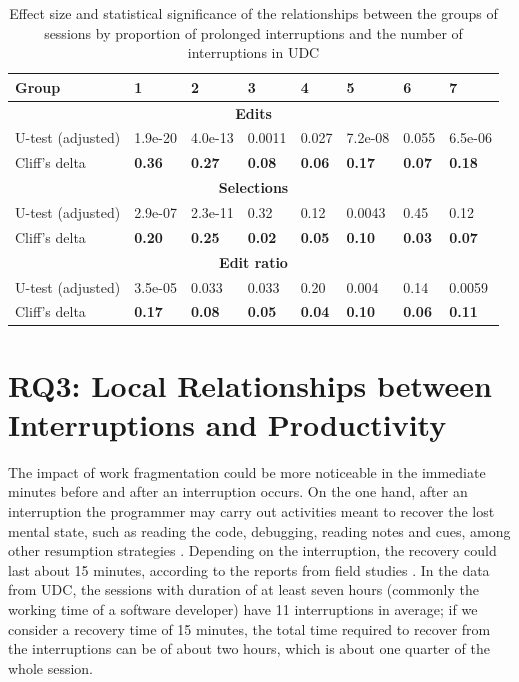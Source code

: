 \documentclass[times]{smrauth}
\begin{document}
\begin{table}[ht!]
	\tiny
	\renewcommand{\arraystretch}{1.3}
	\caption{Effect size and statistical significance of the relationships between the groups of sessions by proportion of prolonged interruptions and the number of interruptions in UDC}
	\label{tbl:effect_size_dur_udc}
	\centering
	\begin{tabular}{l | p{1cm} | p{1cm} | p{1cm} | p{1cm} | p{1cm} | p{1cm} | p{1cm}} 
		Group & 1 & 2 & 3 & 4 & 5 & 6 & 7  \\  
		\hline
		\multicolumn{8}{c}{\textbf{Edits}} \\
		\hline
		U-test (adjusted) & 1.9e-20 & 4.0e-13 & 0.0011 & 0.027 & 7.2e-08 & 0.055 & 6.5e-06\\
		\hline
		Cliff's delta & \textbf{0.36} & \textbf{0.27} & \textbf{0.08} & \textbf{0.06} & \textbf{0.17} & \textbf{0.07} & \textbf{0.18} \\
		\hline
		
		\multicolumn{8}{c}{\textbf{Selections}} \\
		\hline 
		U-test (adjusted) & 2.9e-07 & 2.3e-11 & 0.32 & 0.12 & 0.0043 & 0.45 & 0.12 \\
		\hline
		Cliff's delta & \textbf{0.20} & \textbf{0.25} & \textbf{0.02} & \textbf{0.05} & \textbf{0.10} & \textbf{0.03} & \textbf{0.07} \\  
		\hline
		
		\multicolumn{8}{c}{\textbf{Edit ratio}} \\
		\hline 
		U-test (adjusted) & 3.5e-05 & 0.033 & 0.033 & 0.20 & 0.004 & 0.14 & 0.0059 \\
		\hline 
		Cliff's delta & \textbf{0.17} & \textbf{0.08} & \textbf{0.05} & \textbf{0.04} & \textbf{0.10} & \textbf{0.06} & \textbf{0.11}  \\
		\hline
		
	\end{tabular}
\end{table}


\section{RQ3: Local Relationships between Interruptions and Productivity}

The impact of work fragmentation could be more noticeable in the immediate minutes before and after an interruption occurs. On the one hand, after an interruption the programmer may carry out activities meant to recover the lost mental state, such as reading the code, debugging, reading notes and cues, among other resumption strategies \cite{PR11}. Depending on the interruption, the recovery could last about 15 minutes, according to the reports from field studies \cite{IH07, SBV98}. In the data from UDC, the sessions with duration of at least seven hours (commonly the working time of a software developer) have 11 interruptions in average; if we consider a recovery time of 15 minutes, the total time required to recover from the interruptions can be of about two hours, which is about one quarter of the whole session.
\end{document}
